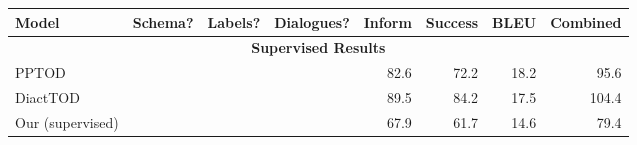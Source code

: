 \documentclass[11pt]{article}
\newcommand{\cmark}{\ding{51}}  %
\newcommand{\devresult}[1]{\textcolor{new-pink}{#1}}  %
\begin{document}
\begin{table}[h!]
\centering
\begin{tabular}{lrrr|rrrr}
\textbf{Model} & \textbf{Schema?} & \textbf{Labels?} & \textbf{Dialogues?} & \textbf{Inform} & \textbf{Success} & \textbf{BLEU} & \textbf{Combined} \\
\hline
\multicolumn{8}{c}{\textbf{Supervised Results}} \\
\hline
PPTOD \cite{su-etal-2022-multi} & \cmark & \cmark & \cmark & 82.6 & 72.2 & 18.2 & 95.6 \\
DiactTOD \cite{wu-etal-2023-diacttod} & \cmark & \cmark & \cmark & 89.5 & 84.2 & 17.5 & 104.4 \\
Our (supervised) & \cmark & \cmark & \cmark & 67.9 & 61.7 & 14.6 & 79.4 \\ 


\end{tabular}
\end{table}
\end{document}

